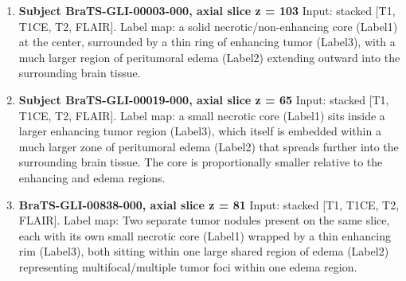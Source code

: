 \begin{enumerate}
    \item \textbf{Subject BraTS-GLI-00003-000, axial slice z = 103}
    Input: stacked [T1, T1CE, T2, FLAIR].
    Label map: a solid necrotic/non-enhancing core (Label1) at the center, surrounded by a thin ring of enhancing tumor (Label3), with a much larger region of peritumoral edema (Label2) extending outward into the surrounding brain tissue.

    \item \textbf{Subject BraTS-GLI-00019-000, axial slice z = 65} Input: stacked [T1, T1CE, T2, FLAIR].
    Label map: a small necrotic core (Label1) sits inside a larger enhancing tumor region (Label3), which itself is embedded within a much larger zone of peritumoral edema (Label2) that spreads further into the surrounding brain tissue. The core is proportionally smaller relative to the enhancing and edema regions.

    \item \textbf{BraTS-GLI-00838-000, axial slice z = 81} Input: stacked [T1, T1CE, T2, FLAIR].
    Label map: Two separate tumor nodules present on the same slice, each with its own small necrotic core (Label1) wrapped by a thin enhancing rim (Label3), both sitting within one large shared region of edema (Label2) representing multifocal/multiple tumor foci within one edema region.
\end{enumerate}
